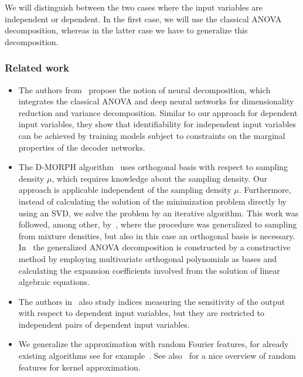 \documentclass{article}
\theoremstyle{definition}
\numberwithin{equation}{section}
\begin{document}
We will distinguish between the two cases where the input variables are independent or dependent. In the first case, we will use the classical ANOVA decomposition, whereas in the latter case we have to generalize this decomposition.


\subsubsection*{Related work}
\begin{itemize}
	\item The authors from~\cite{MaYa20} propose the notion of neural decomposition, which integrates the classical ANOVA and
deep neural networks for dimensionality reduction and
variance decomposition. Similar to our approach for dependent input variables, they show that identifiability for independent input variables can be achieved by
training models subject to constraints on the marginal properties of the decoder networks.
\item The D-MORPH algorithm~\cite{LiRa12} uses orthogonal basis with respect to sampling density $\mu$, which requires knowledge about the sampling density. Our approach is applicable independent of the sampling density $\mu$. Furthermore, instead of calculating the solution of the minimization problem directly by using an SVD, we solve the problem by an iterative algorithm. This work was followed, among other, by~\cite{BoLiBaPlRa22}, where the procedure was generalized to sampling from mixture densities, but also in this case an orthogonal basis is necessary. \\
In~\cite{Ra142} the generalized ANOVA decomposition is constructed by a constructive method by employing multivariate orthogonal polynomials as bases and calculating the expansion
coefficients involved from the solution of linear algebraic equations.
\item The authors in~\cite{ChGa12} also study indices measuring the sensitivity of the
output with respect to dependent input variables, but they are restricted to independent pairs of dependent input variables.
\item We generalize the approximation with random Fourier features, for already existing algorithms see for example~\cite{Ha23, Xie22, HARFE23}. See also~\cite{LiXiYuSu22} for a nice overview of random features for kernel approximation. 
\end{itemize}
\end{document}
